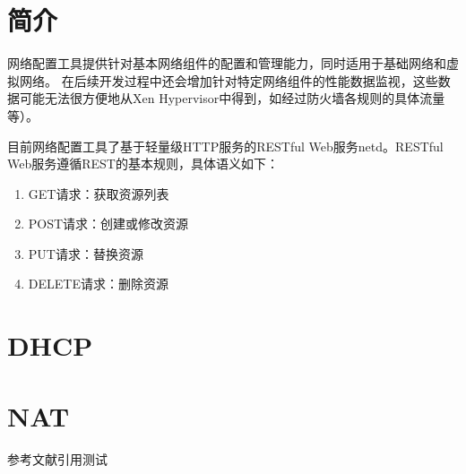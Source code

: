 \section{简介}
网络配置工具提供针对基本网络组件的配置和管理能力，同时适用于基础网络和虚拟网络。
在后续开发过程中还会增加针对特定网络组件的性能数据监视，这些数据可能无法很方便地从Xen Hypervisor中得到，如经过防火墙各规则的具体流量等）。

目前网络配置工具了基于轻量级HTTP服务的RESTful Web服务netd。RESTful Web服务遵循REST的基本规则，具体语义如下：
\begin{enumerate}
\item GET请求：获取资源列表
\item POST请求：创建或修改资源
\item PUT请求：替换资源
\item DELETE请求：删除资源
\end{enumerate}

\section{DHCP}

\section{NAT}

参考文献引用测试\cite{programmer_xiuyang}
